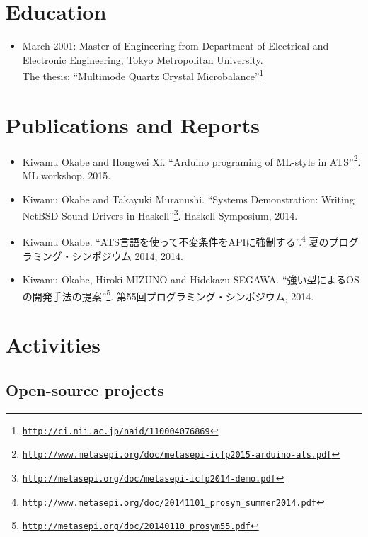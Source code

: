 \documentclass[letterpaper]{article}
\begin{document}
\section*{Education}

\begin{itemize}
  \item March 2001: Master of Engineering from Department of Electrical and Electronic Engineering, Tokyo Metropolitan University. \\
    The thesis: ``Multimode Quartz Crystal Microbalance''\footnote{\href{http://ci.nii.ac.jp/naid/110004076869}{\tt http://ci.nii.ac.jp/naid/110004076869}}
\end{itemize}

\section*{Publications and Reports}

\begin{itemize}
  \item Kiwamu Okabe and Hongwei Xi. ``Arduino programing of ML-style in ATS''\footnote{\href{http://www.metasepi.org/doc/metasepi-icfp2015-arduino-ats.pdf}{\tt http://www.metasepi.org/doc/metasepi-icfp2015-arduino-ats.pdf}}. ML workshop, 2015.
  \item Kiwamu Okabe and Takayuki Muranushi. ``Systems Demonstration: Writing NetBSD Sound Drivers in Haskell''\footnote{\href{http://metasepi.org/doc/metasepi-icfp2014-demo.pdf}{\tt http://metasepi.org/doc/metasepi-icfp2014-demo.pdf}}. Haskell Symposium, 2014.
  \item Kiwamu Okabe. ``ATS言語を使って不変条件をAPIに強制する''.\footnote{\href{http://www.metasepi.org/doc/20141101\_prosym\_summer2014.pdf}{\tt http://www.metasepi.org/doc/20141101\_prosym\_summer2014.pdf}} 夏のプログラミング・シンポジウム 2014, 2014.
  \item Kiwamu Okabe, Hiroki MIZUNO and Hidekazu SEGAWA. ``強い型によるOSの開発手法の提案''\footnote{\href{http://metasepi.org/doc/20140110\_prosym55.pdf}{\tt http://metasepi.org/doc/20140110\_prosym55.pdf}}. 第55回プログラミング・シンポジウム, 2014.
\end{itemize}

\section*{Activities}

\subsection*{Open-source projects}
\end{document}
